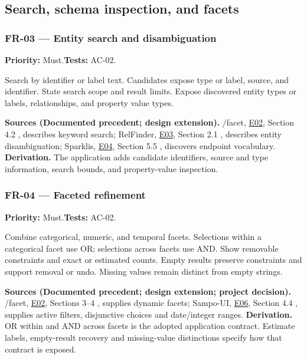 \documentclass[11pt,a4paper]{article}
\newcommand{\req}[4]{\subsubsection*{#1 --- #2}\phantomsection\label{req:#1}\textbf{Priority:} #3.\quad\textbf{Tests:} #4.\par}
\newcommand{\origin}[3]{\par{\small\textbf{Sources (#1).} #2 \textbf{Derivation.} #3\par}}
\newcommand{\evidence}[1]{\hyperlink{evidence:#1}{#1}}
\begin{document}
\subsection{Search, schema inspection, and facets}
\par\noindent\begin{minipage}{\linewidth}
\req{FR-03}{Entity search and disambiguation}{Must}{AC-02}
Search by identifier or label text. Candidates expose type or label, source, and identifier. State search scope and result limits. Expose discovered entity types or labels, relationships, and property value types.
\origin{Documented precedent; design extension}{/facet, \evidence{E02}, Section 4.2 \citep{facet}, describes keyword search; RelFinder, \evidence{E03}, Section 2.1 \citep{relfinder}, describes entity disambiguation; Sparklis, \evidence{E04}, Section 5.5 \citep{sparklis}, discovers endpoint vocabulary.}{The application adds candidate identifiers, source and type information, search bounds, and property-value inspection.}
\end{minipage}\par
\par\noindent\begin{minipage}{\linewidth}
\req{FR-04}{Faceted refinement}{Must}{AC-02}
Combine categorical, numeric, and temporal facets. Selections within a categorical facet use OR; selections across facets use AND. Show removable constraints and exact or estimated counts. Empty results preserve constraints and support removal or undo. Missing values remain distinct from empty strings.
\origin{Documented precedent; design extension; project decision}{/facet, \evidence{E02}, Sections 3--4 \citep{facet}, supplies dynamic facets; Sampo-UI, \evidence{E06}, Section 4.4 \citep{sampoui}, supplies active filters, disjunctive choices and date/integer ranges.}{OR within and AND across facets is the adopted application contract. Estimate labels, empty-result recovery and missing-value distinctions specify how that contract is exposed.}
\end{minipage}\par
\end{document}
